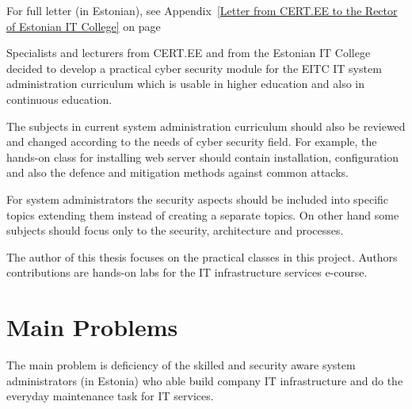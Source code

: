 For full letter (in Estonian), see Appendix~\ref{Letter from CERT.EE to the Rector of Estonian IT College} on page ~\pageref{Letter from CERT.EE to the Rector of Estonian IT College}

Specialists and lecturers from \gls{CERT.EE} and from the Estonian IT College decided to develop a practical cyber security module for the \gls{EITC} IT system administration curriculum which is usable in higher education and also in continuous education.

The subjects in current system administration curriculum should also be reviewed and changed according to the needs of cyber security field. For example, the hands-on class for installing web server should contain installation, configuration and also the defence and mitigation methods against common attacks. 

For system administrators the security aspects should be included into specific topics extending them instead of creating a separate topics. On other hand some subjects should focus only to the security, architecture and processes.

The author of this thesis focuses on the practical classes in this project. Authors contributions are hands-on labs for the IT infrastructure services e-course.

\section{Main Problems}
The main problem is deficiency of the skilled and security aware system administrators (in Estonia) who able build company IT infrastructure and do the everyday maintenance task for IT services.

